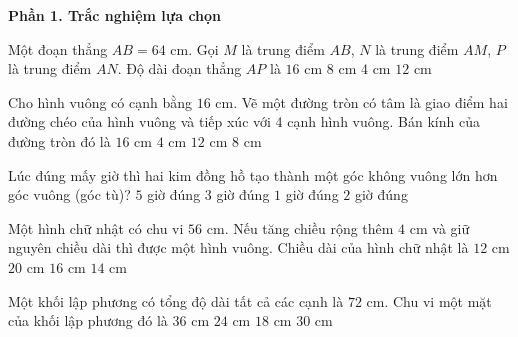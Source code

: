 \textbf{Phần 1. Trắc nghiệm lựa chọn}

\begin{ex} %
Một đoạn thẳng $AB = 64\text{ cm}$. Gọi $M$ là trung điểm $AB$, $N$ là trung điểm $AM$, $P$ là trung điểm $AN$. Độ dài đoạn thẳng $AP$ là
\choice
{$16\text{ cm}$}
{\True $8\text{ cm}$}
{$4\text{ cm}$}
{$12\text{ cm}$}
\end{ex}

\begin{ex} %
Cho hình vuông có cạnh bằng $16\text{ cm}$. Vẽ một đường tròn có tâm là giao điểm hai đường chéo của hình vuông và tiếp xúc với 4 cạnh hình vuông. Bán kính của đường tròn đó là
\choice
{$16\text{ cm}$}
{$4\text{ cm}$}
{$12\text{ cm}$}
{\True $8\text{ cm}$}
\end{ex}

\begin{ex} %
Lúc đúng mấy giờ thì hai kim đồng hồ tạo thành một góc không vuông lớn hơn góc vuông (góc tù)?
\choice
{\True $5$ giờ đúng}
{$3$ giờ đúng}
{$1$ giờ đúng}
{$2$ giờ đúng}
\end{ex}

\begin{ex} %
Một hình chữ nhật có chu vi $56\text{ cm}$. Nếu tăng chiều rộng thêm $4\text{ cm}$ và giữ nguyên chiều dài thì được một hình vuông. Chiều dài của hình chữ nhật là
\choice
{$12\text{ cm}$}
{$20\text{ cm}$}
{\True $16\text{ cm}$}
{$14\text{ cm}$}
\end{ex}

\begin{ex} %
Một khối lập phương có tổng độ dài tất cả các cạnh là $72\text{ cm}$. Chu vi một mặt của khối lập phương đó là
\choice
{$36\text{ cm}$}
{\True $24\text{ cm}$}
{$18\text{ cm}$}
{$30\text{ cm}$}
\end{ex}

